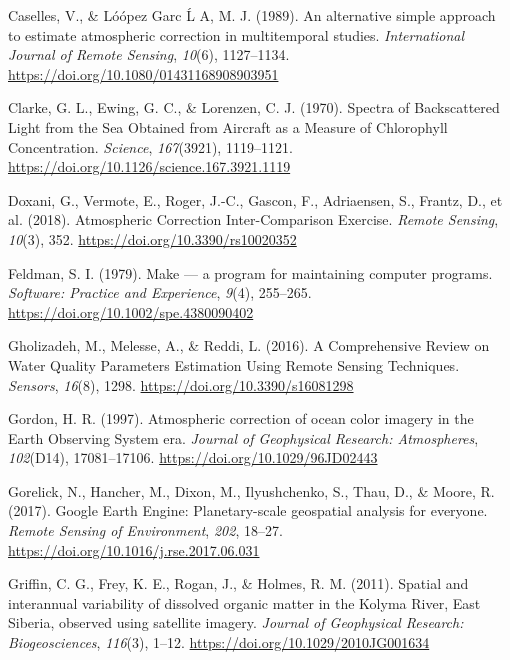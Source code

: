 \documentclass[]{article}
\begin{document}
\leavevmode\hypertarget{ref-Caselles1989}{}%
Caselles, V., \& Lóópez Garc Ĺ A, M. J. (1989). An alternative simple
approach to estimate atmospheric correction in multitemporal studies.
\emph{International Journal of Remote Sensing}, \emph{10}(6),
1127--1134. \url{https://doi.org/10.1080/01431168908903951}

\leavevmode\hypertarget{ref-Clarke1970}{}%
Clarke, G. L., Ewing, G. C., \& Lorenzen, C. J. (1970). Spectra of
Backscattered Light from the Sea Obtained from Aircraft as a Measure of
Chlorophyll Concentration. \emph{Science}, \emph{167}(3921), 1119--1121.
\url{https://doi.org/10.1126/science.167.3921.1119}

\leavevmode\hypertarget{ref-Doxani2018}{}%
Doxani, G., Vermote, E., Roger, J.-C., Gascon, F., Adriaensen, S.,
Frantz, D., et al. (2018). Atmospheric Correction Inter-Comparison
Exercise. \emph{Remote Sensing}, \emph{10}(3), 352.
\url{https://doi.org/10.3390/rs10020352}

\leavevmode\hypertarget{ref-Feldman1979}{}%
Feldman, S. I. (1979). Make --- a program for maintaining computer
programs. \emph{Software: Practice and Experience}, \emph{9}(4),
255--265. \url{https://doi.org/10.1002/spe.4380090402}

\leavevmode\hypertarget{ref-Gholizadeh2016}{}%
Gholizadeh, M., Melesse, A., \& Reddi, L. (2016). A Comprehensive Review
on Water Quality Parameters Estimation Using Remote Sensing Techniques.
\emph{Sensors}, \emph{16}(8), 1298.
\url{https://doi.org/10.3390/s16081298}

\leavevmode\hypertarget{ref-Gordon1997}{}%
Gordon, H. R. (1997). Atmospheric correction of ocean color imagery in
the Earth Observing System era. \emph{Journal of Geophysical Research:
Atmospheres}, \emph{102}(D14), 17081--17106.
\url{https://doi.org/10.1029/96JD02443}

\leavevmode\hypertarget{ref-Gorelick2017}{}%
Gorelick, N., Hancher, M., Dixon, M., Ilyushchenko, S., Thau, D., \&
Moore, R. (2017). Google Earth Engine: Planetary-scale geospatial
analysis for everyone. \emph{Remote Sensing of Environment}, \emph{202},
18--27. \url{https://doi.org/10.1016/j.rse.2017.06.031}

\leavevmode\hypertarget{ref-Griffin2011}{}%
Griffin, C. G., Frey, K. E., Rogan, J., \& Holmes, R. M. (2011). Spatial
and interannual variability of dissolved organic matter in the Kolyma
River, East Siberia, observed using satellite imagery. \emph{Journal of
Geophysical Research: Biogeosciences}, \emph{116}(3), 1--12.
\url{https://doi.org/10.1029/2010JG001634}
\end{document}
